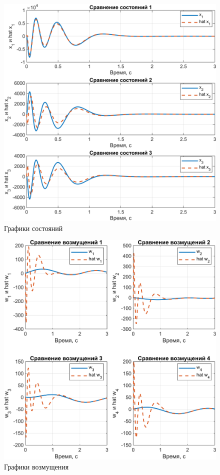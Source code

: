 \begin{figure}[H]
    \centering
    \includegraphics[width=\linewidth]{figs/task3_5.png}
    \caption{Графики состояний}
    \label{fig:3.5}
\end{figure}

\begin{figure}[H]
    \centering
    \includegraphics[width=\linewidth]{figs/task3_6.png}
    \caption{Графики возмущения}
    \label{fig:3.6}
\end{figure}


